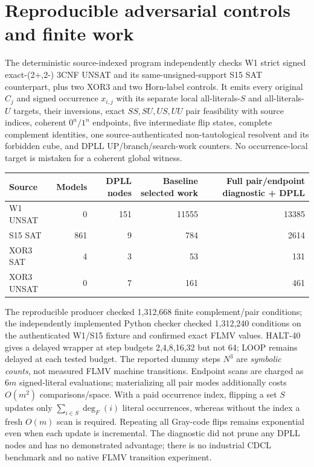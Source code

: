 \documentclass[11pt]{article}
\begin{document}
\section{Reproducible adversarial controls and finite work}
The deterministic source-indexed program independently checks W1 strict signed exact-(2+,2-) 3CNF UNSAT and its same-unsigned-support S15 SAT counterpart, plus two XOR3 and two Horn-label controls. It emits every original $C_j$ and signed occurrence $x_{i,j}$ with its separate local all-literals-$S$ and all-literals-$U$ targets, their inversions, exact $SS,SU,US,UU$ pair feasibility with source indices, coherent $0^n/1^n$ endpoints, five intermediate flip states, complete complement identities, one source-authenticated non-tautological resolvent and its forbidden cube, and DPLL UP/branch/search-work counters. No occurrence-local target is mistaken for a coherent global witness.
\begin{center}
\begin{tabular}{lrrrr}
\toprule Source & Models & DPLL nodes & Baseline selected work & Full pair/endpoint diagnostic + DPLL\\\midrule
W1 UNSAT &0&151&11555&13385\\
S15 SAT &861&9&784&2614\\
XOR3 SAT &4&3&53&131\\
XOR3 UNSAT &0&7&161&461\\
\bottomrule
\end{tabular}
\end{center}
The reproducible producer checked 1,312,668 finite complement/pair conditions; the independently implemented Python checker checked 1,312,240 conditions on the authenticated W1/S15 fixture and confirmed exact FLMV values. HALT-40 gives a delayed wrapper at step budgets 2,4,8,16,32 but not 64; LOOP remains delayed at each tested budget. The reported dummy steps $N^3$ are \emph{symbolic counts}, not measured FLMV machine transitions. Endpoint scans are charged as $6m$ signed-literal evaluations; materializing all pair modes additionally costs $O(m^2)$ comparisons/space. With a paid occurrence index, flipping a set $S$ updates only $\sum_{i\in S}\deg_F(i)$ literal occurrences, whereas without the index a fresh $O(m)$ scan is required. Repeating all Gray-code flips remains exponential even when each update is incremental. The diagnostic did not prune any DPLL nodes and has no demonstrated advantage; there is no industrial CDCL benchmark and no native FLMV transition experiment.
\end{document}

